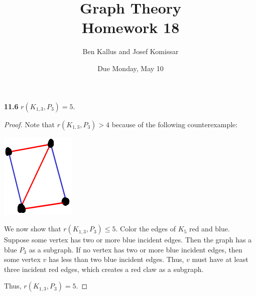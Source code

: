 \documentclass[12pt]{article}
\title{Graph Theory \\ Homework 18}
\author{Ben Kallus and Josef Komissar}
\date{Due Monday, May 10}
\begin{document}
\maketitle

\medskip\noindent\textbf{11.6} $r(K_{1, 3}, P_3) = 5$.
\begin{proof}
    Note that $r(K_{1, 3}, P_3) > 4$ because of the following counterexample:

    \begin{center} \includegraphics{1.png} \end{center}

    We now show that $r(K_{1, 3}, P_3) \leq 5$.
    Color the edges of $K_5$ red and blue.
    Suppose some vertex has two or more blue incident edges.
    Then the graph has a blue $P_3$ as a subgraph.
    If no vertex has two or more blue incident edges, then some vertex $v$ has less than two blue incident edges.
    Thus, $v$ must have at least three incident red edges, which creates a red claw as a subgraph.

    Thus, $r(K_{1, 3}, P_3) = 5$.
\end{proof}
\end{document}
